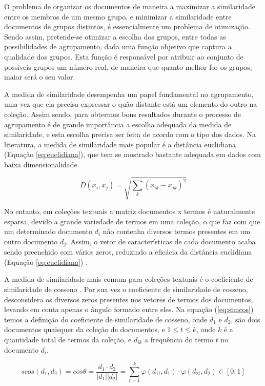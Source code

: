 O problema de organizar os documentos de maneira a maximizar a similaridade entre os membros de um
mesmo grupo, e minimizar a similaridade entre documentos de grupos distintos, é essencialmente um
problema de otimização.  Sendo assim, pretende-se otimizar a escolha dos grupos, entre
todas as possibilidades de agrupamento, dada uma função objetivo que captura a qualidade dos grupos.
Esta função é responsável por atribuir ao conjunto de possíveis grupos um número real, de maneira
que quanto melhor for os grupos, maior será o seu valor\cite{Feldman2007}.

A medida de similaridade desempenha um papel fundamental no agrupamento, uma vez que ela precisa
expressar o quão distante está um elemento do outro na coleção. Assim sendo, para obtermos bons
resultados durante o processo de agrupamento é de grande importância a escolha adequada da medida
de similaridade, e esta escolha precisa ser feita de acordo com o tipo dos dados.  Na literatura, a
medida de similaridade mais popular é a distância euclidiana (Equação
\ref{eq:euclidiana}), que tem se mostrado bastante adequada em dados com baixa dimensionalidade.

\begin{equation} 
  D(x_{i}, x_{j}) = \sqrt{\sum_k{(x_{ik}-x_{jk})^2}} 
  \label{eq:euclidiana}
\end{equation}

No entanto, em coleções textuais a matriz documentos x termos é naturalmente esparsa, devido a
grande variedade de termos em uma coleção, o que faz com que um determinado documento $d_{i}$ não
contenha diversos termos presentes em um outro documento $d_{j}$. Assim, o vetor de
características de cada documento acaba sendo preenchido com vários zeros, reduzindo a eficácia da
distância euclidiana (Equação \ref{eq:euclidiana}) \cite{Nogueira2013}. 

A medida de similaridade mais comum para coleções textuais é o coeficiente de similaridade de cosseno
\cite{Feldman2007}.  Por sua vez o coeficiente de similaridade de cosseno,
desconsidera os diversos zeros presentes nos vetores de termos dos documentos, levando em conta
apenas o ângulo formado entre eles\cite{Nogueira2013}.  Na equação (\ref{eq:simcos}) temos a
definição do coeficiente de similaridade de cosseno, onde $d_1$ e $d_2$, são dois documentos
quaisquer da coleção de documentos, e $1 \leq t \leq k$, onde $k$ é a quantidade total de termos da
coleção, e $d_{ik}$ a frequência do termo $t$ no documento $d_i$.

\begin{equation} 
  scos(d_{1}, d_{2}) = cos\theta = \frac{d_{1} \cdot d_{2}}{|d_{1}||d_{2}|} =
  \sum_{t=1}^k{\varphi(d_{1t},d_1) \cdot \varphi(d_{2t},d_2)} \in [0,1] 
  \label{eq:simcos}
\end{equation}

